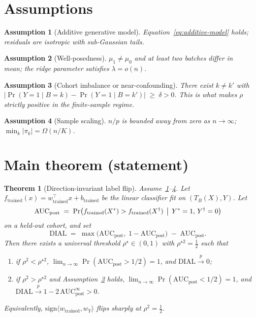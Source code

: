 \documentclass[11pt,a4paper]{article}
\newtheorem{theorem}{Theorem}
\newtheorem{assumption}{Assumption}
\begin{document}
\section{Assumptions}

\begin{assumption}[Additive generative model]
\label{asm:additive}
Equation~\eqref{eq:additive-model} holds; residuals are isotropic with
sub-Gaussian tails.
\end{assumption}

\begin{assumption}[Well-posedness]
\label{asm:wellposed}
$\mu_1\ne\mu_0$ and at least two batches differ in mean; the ridge
parameter satisfies $\lambda = o(n)$.
\end{assumption}

\begin{assumption}[Cohort imbalance or near-confounding]
\label{asm:conf}
There exist $k\ne k'$ with $\bigl|\Pr(Y=1\mid B=k)-\Pr(Y=1\mid B=k')\bigr|\;\ge\;\delta>0$.
This is what makes $\rho$ strictly positive in the finite-sample regime.
\end{assumption}

\begin{assumption}[Sample scaling]
\label{asm:n}
$n/p$ is bounded away from zero as $n\to\infty$; $\min_k|\pi_k| = \Omega(n/K)$.
\end{assumption}

\section{Main theorem (statement)}

\begin{theorem}[Direction-invariant label flip]
\label{thm:flip}
Assume~\ref{asm:additive}--\ref{asm:n}. Let $f_{\text{trained}}(x)=
w_{\text{trained}}^{\!\top}x + b_{\text{trained}}$ be the linear
classifier fit on $(T_B(X),Y)$. Let
\[
   \mathrm{AUC}_{\text{post}}
   \;=\; \Pr\bigl(f_{\text{trained}}(X^\ast)>f_{\text{trained}}(X^\dagger)\,\bigm|\, Y^\ast=1,\,Y^\dagger=0\bigr)
\]
on a held-out cohort, and set
\[
   \mathrm{DIAL}
   \;=\; \max\!\bigl(\mathrm{AUC}_{\text{post}},\;1-\mathrm{AUC}_{\text{post}}\bigr)
         \;-\; \mathrm{AUC}_{\text{post}}.
\]
Then there exists a universal threshold $\rho^\star\in(0,1)$ with
$\rho^{\star 2}=\tfrac12$ such that
\begin{enumerate}
\item[\textup{(i)}] if $\rho^2<\rho^{\star 2}$,
 $\lim_{n\to\infty}\Pr(\mathrm{AUC}_{\text{post}}>1/2)=1$,
 and $\mathrm{DIAL}\xrightarrow{p}0$;
\item[\textup{(ii)}] if $\rho^2>\rho^{\star 2}$ and Assumption~\ref{asm:conf} holds,
 $\lim_{n\to\infty}\Pr(\mathrm{AUC}_{\text{post}}<1/2)=1$,
 and $\mathrm{DIAL}\xrightarrow{p} 1-2\,\mathrm{AUC}_{\text{post}}^{\infty}>0$.
\end{enumerate}
Equivalently, $\mathrm{sign}\langle w_{\text{trained}},w_Y\rangle$ flips
sharply at $\rho^2=\tfrac12$.
\end{theorem}
\end{document}
